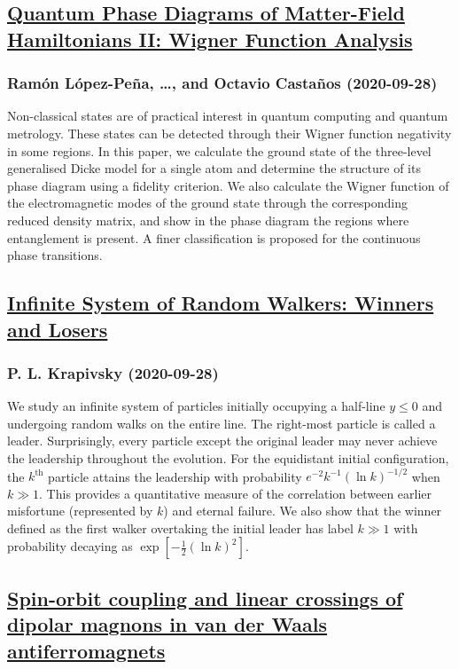 \subsection*{\href{http://arxiv.org/abs/2009.13663v1}{Quantum Phase Diagrams of Matter-Field Hamiltonians II: Wigner Function  Analysis}}
\subsubsection*{Ramón López-Peña, \dots, and Octavio Castaños (2020-09-28)}
Non-classical states are of practical interest in quantum computing and
quantum metrology. These states can be detected through their Wigner function
negativity in some regions. In this paper, we calculate the ground state of the
three-level generalised Dicke model for a single atom and determine the
structure of its phase diagram using a fidelity criterion. We also calculate
the Wigner function of the electromagnetic modes of the ground state through
the corresponding reduced density matrix, and show in the phase diagram the
regions where entanglement is present. A finer classification is proposed for
the continuous phase transitions.

\subsection*{\href{http://arxiv.org/abs/2009.13661v1}{Infinite System of Random Walkers: Winners and Losers}}
\subsubsection*{P. L. Krapivsky (2020-09-28)}
We study an infinite system of particles initially occupying a half-line
$y\leq 0$ and undergoing random walks on the entire line. The right-most
particle is called a leader. Surprisingly, every particle except the original
leader may never achieve the leadership throughout the evolution. For the
equidistant initial configuration, the $k^{\text{th}}$ particle attains the
leadership with probability $e^{-2} k^{-1} (\ln k)^{-1/2}$ when $k\gg 1$. This
provides a quantitative measure of the correlation between earlier misfortune
(represented by $k$) and eternal failure. We also show that the winner defined
as the first walker overtaking the initial leader has label $k\gg 1$ with
probability decaying as $\exp\!\left[-\tfrac{1}{2}(\ln k)^2\right]$.

\subsection*{\href{http://arxiv.org/abs/2009.13660v1}{Spin-orbit coupling and linear crossings of dipolar magnons in van der  Waals antiferromagnets}}
